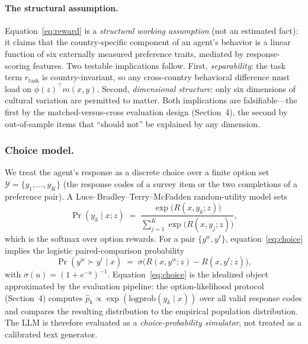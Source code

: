 \documentclass[11pt,letterpaper]{article}
\begin{document}
\paragraph{The structural assumption.}
Equation~\eqref{eq:reward} is a \emph{structural working assumption} (not an estimated fact): it claims that the country-specific component of an agent's behavior is a linear function of six externally measured preference traits, mediated by response-scoring features. Two testable implications follow. First, \emph{separability}: the task term $r_{\mathrm{task}}$ is country-invariant, so any cross-country behavioral difference must load on $\phi(z)^{\!\top} m(x,y)$. Second, \emph{dimensional structure}: only six dimensions of cultural variation are permitted to matter. Both implications are falsifiable---the first by the matched-versus-cross evaluation design (Section~4), the second by out-of-sample items that ``should not'' be explained by any dimension.

\subsubsection{Choice model.}
We treat the agent's response as a discrete choice over a finite option set $\mathcal{Y} = \{y_1,\dots,y_K\}$ (the response codes of a survey item or the two completions of a preference pair). A Luce--Bradley--Terry--McFadden random-utility model sets
\begin{equation}
  \Pr(y_k \mid x; z) \;=\; \frac{\exp\bigl(R(x,y_k;z)\bigr)}{\sum_{j=1}^{K}\exp\bigl(R(x,y_j;z)\bigr)},
  \label{eq:choice}
\end{equation}
which is the softmax over option rewards. For a pair $\{y^{w}, y^{\ell}\}$, equation~\eqref{eq:choice} implies the logistic paired-comparison probability
\begin{equation}
  \Pr(y^{w}\succ y^{\ell}\mid x) \;=\; \sigma\bigl(R(x,y^{w};z)-R(x,y^{\ell};z)\bigr),
  \label{eq:bt}
\end{equation}
with $\sigma(u) = (1+e^{-u})^{-1}$. Equation~\eqref{eq:choice} is the idealized object approximated by the evaluation pipeline: the option-likelihood protocol (Section~4) computes $\hat{p}_k \propto \exp(\text{logprob}(y_k\mid x))$ over all valid response codes and compares the resulting distribution to the empirical population distribution. The LLM is therefore evaluated as a \emph{choice-probability simulator}, not treated as a calibrated text generator.
\end{document}
